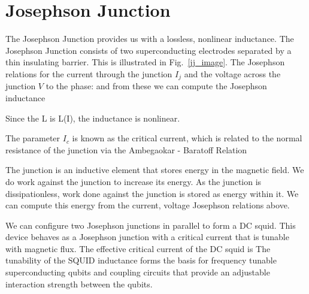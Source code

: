 \section{Josephson Junction}
The Josephson Junction provides us with a lossless, nonlinear inductance.\cite{Josephson1962}
The Josephson Junction consists of two superconducting electrodes separated by a thin insulating barrier.
This is illustrated in Fig.~\ref{jj_image}.
\draftcomment{We follow a derivation due to Van Duzer, cite Josephson
In 1962 Brian Josephson derived the following relations for (TODO: Cooper pair tunneling accross the junction)
Nobel 1973
}%
The Josephson relations for the current through the junction $I_j$ and the voltage across the junction $V$ to the phase:
and
from these we can compute the Josephson inductance

Since the L is L(I), the inductance is nonlinear.

The parameter $I_c$ is known as the critical current, which is related to the normal resistance of the junction via the
Ambegaokar - Baratoff Relation \cite{Ambegaokar1963}

The junction is an inductive element that stores energy in the magnetic field.  We do work against the junction to increase its energy.
As the junction is dissipationless, work done against the junction is stored as energy within it.
We can compute this energy from the current, voltage Josephson relations above.

We can configure two Josephson junctions in parallel to form a DC squid.
This device behaves as a Josephson junction with a critical current that is tunable with magnetic flux.
The effective critical current of the DC squid is \cite{vanDuzer1999}
The tunability of the SQUID inductance forms the basis for frequency tunable superconducting qubits
and coupling circuits that provide an adjustable interaction strength between the qubits.

